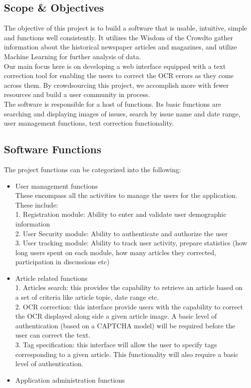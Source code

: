 \documentclass[amsart, 12pt]{article}
\begin{document}
\subsection{Scope \& Objectives}
The objective of this project is to build a software that is usable, intuitive, simple and functions well consistently. It utilizes the \textgravedbl Wisdom of the Crowd\textacutedbl to gather information about the historical newspaper articles and magazines, and utilize Machine Learning for further analysis of data.\\
Our main focus here is on developing a web interface equipped with a text correction tool for enabling the users to correct the OCR errors as they come across them. By crowdsourcing this project, we accomplish more with fewer resources and build a user community in process.\\
The software is responsible for a host of functions. Its basic functions are searching and displaying images of issues, search by issue name and date range, user management functions, text correction functionality.\\
\subsection{Software Functions}
The project functions can be categorized into the following:
\begin{itemize}
\item User management functions \\
These encompass all the activities to manage the users for the application.  These include: \\
1.	Registration module: Ability to enter and validate user demographic information \\
2.	User Security module: Ability to authenticate and authorize the user \\
3.	User tracking module: Ability to track user activity, prepare statistics (how long users spent on each module, how many articles they corrected, participation in discussions etc) \\

\item Article related functions \\
1.	Articles search: this provides the capability to retrieve an article based on a set of criteria like article topic, date range etc. \\
2.	OCR correction: this interface provide users with the capability to correct the OCR displayed along side a given article image.  A basic level of authentication (based on a CAPTCHA model) will be required before the user can correct the text. \\
3.	Tag specification: this interface will allow the user to specify tags corresponding to a given article.  This functionality will also require a basic level of authentication. \\

\item Application administration functions
\end{itemize}
\end{document}
